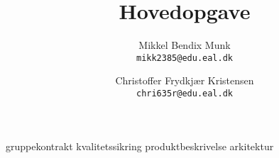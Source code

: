 \documentclass[a4paper, 11pt, danish]{report}
\title{Hovedopgave}
\author{
    Mikkel Bendix Munk\\
    \texttt{mikk2385@edu.eal.dk}
    \and
    Christoffer Frydkjær Kristensen\\
    \texttt{chri635r@edu.eal.dk}
}
\begin{document}
\maketitle
\tableofcontents{}
\newpage
%
%
%
{gruppekontrakt}
{kvalitetssikring}
{produktbeskrivelse}
{arkitektur}
%
%
\end{document}
